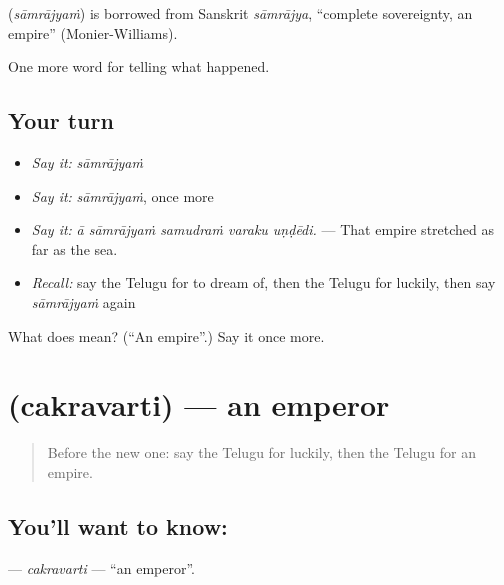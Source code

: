 \begin{cousinweb}
\textbf{} (\emph{sāmrājyaṁ}) is borrowed from Sanskrit \emph{sāmrājya}, \textquotedblleft{}complete sovereignty, an empire\textquotedblright{} (Monier-Williams).
\end{cousinweb}

\begin{grammarlens}[title={What you've built}]
One more word for telling what happened.
\end{grammarlens}

\subsection*{Your turn}
\begin{itemize}
\raggedright
  \item \emph{Say it:} \emph{sāmrājyaṁ}
  \item \emph{Say it:} \emph{sāmrājyaṁ}, once more
  \item \emph{Say it:} \emph{ā sāmrājyaṁ samudraṁ varaku uṇḍēdi.} — That empire stretched as far as the sea.
  \item \emph{Recall:} say the Telugu for to dream of, then the Telugu for luckily, then say \emph{sāmrājyaṁ} again
\end{itemize}

\begin{tcolorbox}[breakable,colback=teal!4,colframe=teal!35!black,title={Before you move on}]
What does  mean? (\textquotedblleft{}An empire\textquotedblright{}.) Say it once more.
\end{tcolorbox}
\section[\texorpdfstring{\te{చక్రవర్తి} (cakravarti)}{చక్రవర్తి (cakravarti)}]{ (cakravarti) — an emperor}

\label{lesson:TE-C359-cakravarti}



\begin{quote}
Before the new one: say the Telugu for luckily, then the Telugu for an empire.
\end{quote}

\subsection*{You'll want to know: }
\textbf{} — \emph{cakravarti} — \textquotedblleft{}an emperor\textquotedblright{}.


